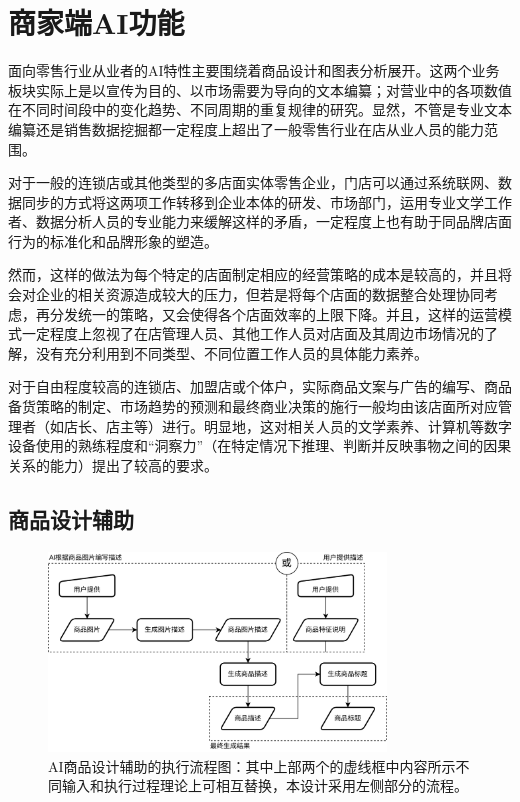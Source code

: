 \newpage
\section{商家端AI功能}
\label{sec:owner_features}

面向零售行业从业者的AI特性主要围绕着商品设计和图表分析展开。这两个业务板块实际上是以宣传为目的、以市场需要为导向的文本编纂；对营业中的各项数值在不同时间段中的变化趋势、不同周期的重复规律的研究。显然，不管是专业文本编纂还是销售数据挖掘都一定程度上超出了一般零售行业在店从业人员的能力范围。

对于一般的连锁店或其他类型的多店面实体零售企业，门店可以通过系统联网、数据同步的方式将这两项工作转移到企业本体的研发、市场部门，运用专业文学工作者、数据分析人员的专业能力来缓解这样的矛盾，一定程度上也有助于同品牌店面行为的标准化和品牌形象的塑造。

然而，这样的做法为每个特定的店面制定相应的经营策略的成本是较高的，并且将会对企业的相关资源造成较大的压力，但若是将每个店面的数据整合处理协同考虑，再分发统一的策略，又会使得各个店面效率的上限下降。并且，这样的运营模式一定程度上忽视了在店管理人员、其他工作人员对店面及其周边市场情况的了解，没有充分利用到不同类型、不同位置工作人员的具体能力素养。

对于自由程度较高的连锁店、加盟店或个体户，实际商品文案与广告的编写、商品备货策略的制定、市场趋势的预测和最终商业决策的施行一般均由该店面所对应管理者（如店长、店主等）进行。明显地，这对相关人员的文学素养、计算机等数字设备使用的熟练程度和“洞察力”（在特定情况下推理、判断并反映事物之间的因果关系的能力）提出了较高的要求。

\subsection{商品设计辅助}

\begin{figure}[htbp]
	\centering
	\includegraphics[width=0.8\textwidth]{./imgs/ai-writeup.png}
	\caption{AI商品设计辅助的执行流程图：其中上部两个的虚线框中内容所示不同输入和执行过程理论上可相互替换，本设计采用左侧部分的流程。}
	\label{fig:ai-writeup}
\end{figure}

